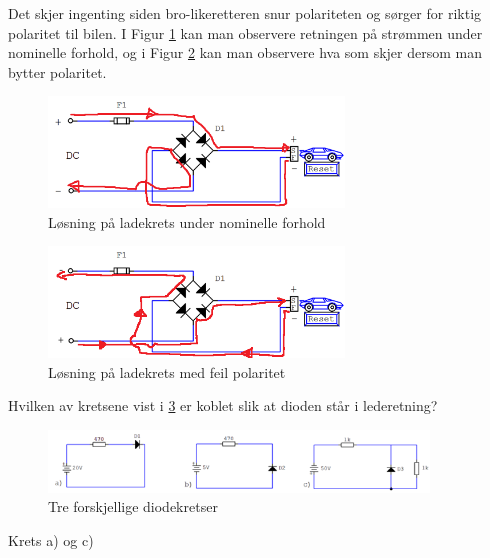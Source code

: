 \begin{solution}[name=Løsningsforslag oppgave]
Det skjer ingenting siden bro-likeretteren snur polariteten og sørger for riktig polaritet til bilen. I Figur \ref{fig:BroLadingSol} kan man observere retningen på strømmen under nominelle forhold, og i Figur \ref{fig:BroLadingSol2} kan man observere hva som skjer dersom man bytter polaritet.

\begin{figure}[H]
	\centering
	\includegraphics[width=0.7\textwidth]{diode/figurer/GretzLadingVanlig-SOL.png}
	\caption{Løsning på ladekrets under nominelle forhold}
	\label{fig:BroLadingSol}
\end{figure}
	
\begin{figure}[H]
	\centering
	\includegraphics[width=0.7\textwidth]{diode/figurer/GretzLadingFeil-SOL.png}
	\caption{Løsning på ladekrets med feil polaritet}
	\label{fig:BroLadingSol2}
\end{figure}	
	
	
\end{solution}





\vspace{0.5cm} %

\begin{question}[name=Oppgave, topic=dioder]
	Hvilken av kretsene vist i \ref{fig:3kretser} er koblet slik at dioden står i lederetning?
	
	\begin{figure}[H]
		\centering
		\includegraphics[width=0.9\textwidth]{diode/figurer/3Kretser.png}
		\caption{Tre forskjellige diodekretser}
		\label{fig:3kretser}
	\end{figure}
	
\end{question}

\vspace{0.5cm} %

\begin{solution}[name=Løsningsforslag oppgave]
	Krets a) og c)
\end{solution}
\vspace{0.5cm} %
